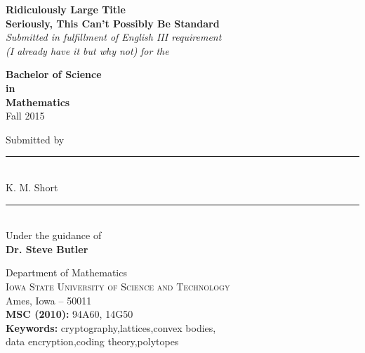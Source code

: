 \begin{titlepage}

\begin{center}

\Large \textbf {Ridiculously Large Title \\ Seriously, This Can't Possibly Be Standard}\\[0.5in]

       \small \emph{Submitted in fulfillment of English III requirement \\ (I already have it but why not)}
        \small \emph{for the}
		\vspace{.05in}

       {\bf Bachelor of Science \\in\\ Mathematics}\\[0.3in]
       
    	Fall 2015 
    	\vspace{.45in}


\normalsize Submitted by \\
\medskip
\rule{40mm}{.1pt} \\
\vspace{.05in} 
K. M. Short \\
\vspace{.05in}
\rule{40mm}{.1pt} \\

\vspace{.1in}
Under the guidance of\\
{\textbf{Dr. Steve Butler}}\\[0.3in]

\vfill

\Large{Department of Mathematics}\\
\normalsize
\textsc{Iowa State University of Science and Technology}\\ 
Ames, Iowa -- 50011 \\
\vspace{0.4cm}
\textrm{\textbf{MSC (2010):} 94A60, 14G50} \\
\textrm{\textbf{Keywords:} cryptography,lattices,convex bodies, \\ data encryption,coding theory,polytopes}
\end{center}

\end{titlepage}
